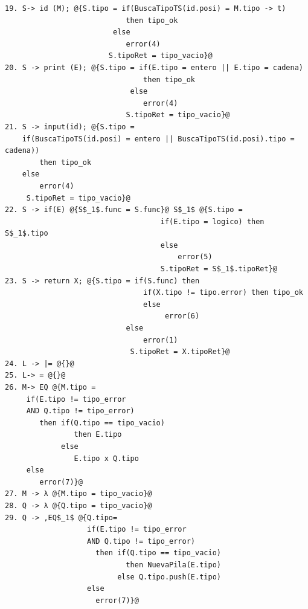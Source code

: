\begin{lstlisting}[style=EdT]
19. S-> id (M); @{S.tipo = if(BuscaTipoTS(id.posi) = M.tipo -> t)
        					then tipo_ok
    					 else
        					error(4)
        				S.tipoRet = tipo_vacio}@
20. S -> print (E); @{S.tipo = if(E.tipo = entero || E.tipo = cadena)
        						then tipo_ok
    						 else
        						error(4)
        					S.tipoRet = tipo_vacio}@
21. S -> input(id); @{S.tipo =
	if(BuscaTipoTS(id.posi) = entero || BuscaTipoTS(id.posi).tipo = cadena))
    	then tipo_ok
    else
    	error(4)
     S.tipoRet = tipo_vacio}@
22. S -> if(E) @{S$_1$.func = S.func}@ S$_1$ @{S.tipo =
    								if(E.tipo = logico) then S$_1$.tipo
    								else
        								error(5)
     								S.tipoRet = S$_1$.tipoRet}@
23. S -> return X; @{S.tipo = if(S.func) then
        						if(X.tipo != tipo.error) then tipo_ok
        						else
           							 error(6)
     						else
        						error(1)
    						 S.tipoRet = X.tipoRet}@
24. L -> |= @{}@
25. L-> = @{}@
26. M-> EQ @{M.tipo =
     if(E.tipo != tipo_error
     AND Q.tipo != tipo_error)
        then if(Q.tipo == tipo_vacio)
                then E.tipo
             else
                E.tipo x Q.tipo
     else
        error(7)}@
27. M -> λ @{M.tipo = tipo_vacio}@
28. Q -> λ @{Q.tipo = tipo_vacio}@
29. Q -> ,EQ$_1$ @{Q.tipo=
                   if(E.tipo != tipo_error
                   AND Q.tipo != tipo_error)
                     then if(Q.tipo == tipo_vacio)
                            then NuevaPila(E.tipo)
                          else Q.tipo.push(E.tipo)
                   else
                     error(7)}@
                     
                     
                     
                     
                     
                     
                     

\end{lstlisting}
